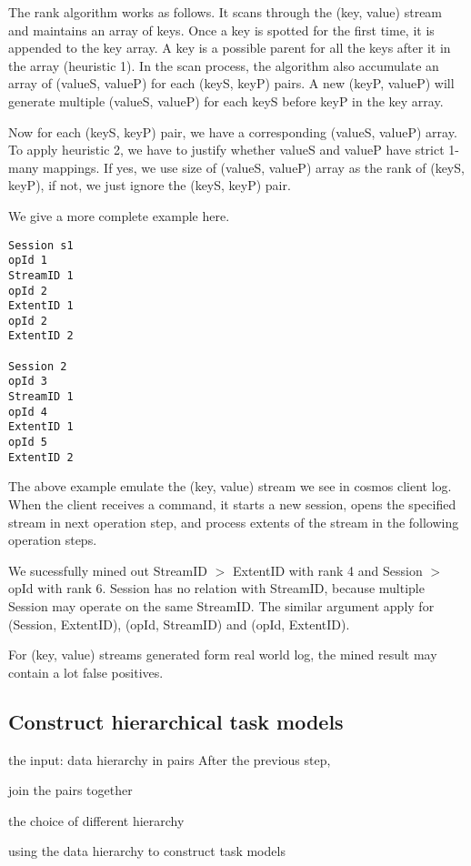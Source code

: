The rank algorithm works as follows. It scans through the
(key, value) stream and maintains an array of keys. Once a
key is spotted for the first time, it is appended to the key
array. A key is a possible parent for all the keys after it
in the array (heuristic 1). In the scan process, the algorithm also
accumulate an array of (valueS, valueP) for each (keyS, keyP)
pairs. A new (keyP, valueP) will generate multiple (valueS,
valueP) for each keyS before keyP in the key array.

Now for each (keyS, keyP) pair, we have a corresponding
(valueS, valueP) array. To apply heuristic 2, we have to
justify whether valueS and valueP have strict 1-many
mappings. If yes, we use size of (valueS, valueP) array
as the rank of (keyS, keyP), if not, we just ignore the
(keyS, keyP) pair.


We give a more complete example here.
\begin{verbatim}
Session s1
opId 1
StreamID 1
opId 2
ExtentID 1
opId 2
ExtentID 2

Session 2
opId 3
StreamID 1
opId 4
ExtentID 1
opId 5
ExtentID 2
\end{verbatim}
The above example emulate the (key, value) stream we see in
cosmos client log. When the client receives a command, it
starts a new session, opens the specified stream in next
operation step, and process extents of the stream in the
following operation steps.

We sucessfully mined out StreamID $>$ ExtentID with rank 4
and Session $>$ opId with rank 6. Session has no relation
with StreamID, because multiple Session may operate on the
same StreamID. The similar argument apply for (Session,
ExtentID), (opId, StreamID) and (opId, ExtentID).

For (key, value) streams generated form real world log, the
mined result may contain a lot false positives.


\subsection{Construct hierarchical task models}

the input: data hierarchy in pairs
After the previous step, 

join the pairs together

the choice of different hierarchy

using the data hierarchy to construct task models

